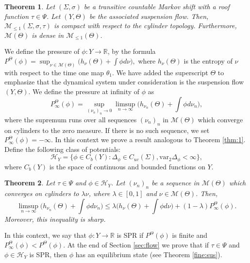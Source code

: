 \documentclass[letterpaper,11pt]{amsart}
\theoremstyle{plain}
\newtheorem{theorem}{Theorem}[section]
\theoremstyle{plain}
\theoremstyle{definition}
\theoremstyle{remark}
\def\R{{\mathbb R}}
\def\M{{\mathcal M}}
\def\H{{\mathcal H}}
\begin{document}
\begin{theorem}\label{compactv} Let  $(\Sigma,\sigma)$ be a transitive countable Markov shift with a roof function $\tau\in \Psi$. Let $(Y,\Theta)$ be the associated  suspension flow.  Then, $\M_{\le1}(\Sigma,\sigma,\tau)$ is  compact with respect to the cylinder topology. Furthermore, $\M(\Theta)$ is dense in $\M_{\le1}(\Theta)$.
\end{theorem}

We define the pressure of $\phi:Y\to\R$, by the formula
$P^\Theta(\phi)=\sup_{\nu\in\M(\Theta)} \big(h_\nu(\Theta)+\int \phi d\nu\big),$
where $h_\nu(\Theta)$ is the entropy of $\nu$ with respect to the time one map $\theta_1$. We have added the superscript $\Theta$ to emphasize that the dynamical system under consideration is the suspension flow $(Y,\Theta)$. We define the pressure at infinity of $\phi$ as
$$P^\Theta_\infty(\phi)=\sup_{(\nu_n)_n\to 0} \limsup_{n\to\infty} \bigg(h_{\nu_n}(\Theta)+\int \phi d\nu_n\bigg),$$
where the supremum runs over all sequences $(\nu_n)_n$ in $\M(\Theta)$ which converge on cylinders to the zero measure. If  there is no such sequence, we set $P^\Theta_\infty(\phi)=-\infty$. In this context we prove a result analogous to Theorem  \ref{thm:1}. Define the following class of potentials:
$$\H_Y=\{\phi\in C_b(Y): \Delta_\phi\in C_{uc}(\Sigma), \text{var}_2\Delta_\phi<\infty\},$$
where $C_b(Y)$ is the space of continuous and bounded functions on $Y$.

 \begin{theorem}\label{thm:susp} Let $\tau\in \Psi$ and $\phi\in \H_Y$. Let $(\nu_n)_n$ be a sequence in $\M(\Theta)$ which converges on cylinders to $\lambda\nu$, where $\lambda\in [0,1]$ and $\nu\in \M(\Theta)$. Then,
$$\limsup_{n\to\infty} \bigg(h_{\nu_n}(\Theta)+\int \phi d\nu_n\bigg)\le \lambda \bigg(h_{\nu}(\Theta)+\int\phi d\nu\bigg)+(1-\lambda)P_\infty^\Theta(\phi).$$
Moreover, this inequality is sharp.
\end{theorem}

In this context, we say that $\phi:Y\to\R$ is SPR if $P^{\Theta}(\phi)$ is finite and $P_\infty^{\Theta}(\phi)<P^\Theta(\phi)$. At the end of Section \ref{sec:flow} we prove that if $\tau\in\Psi$ and $\phi\in \H_Y$ is SPR, then $\phi$ has an equilibrium state (see Theorem \ref{fine:sus}).
\end{document}
